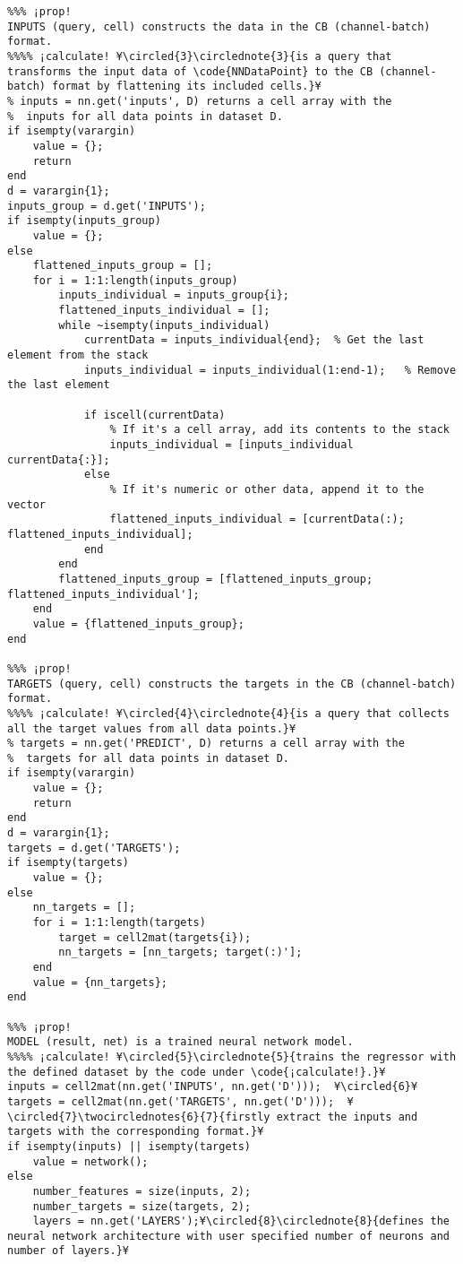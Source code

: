 \documentclass{tufte-handout}
\begin{document}
\begin{lstlisting}
%%% ¡prop!
INPUTS (query, cell) constructs the data in the CB (channel-batch) format.
%%%% ¡calculate! ¥\circled{3}\circlednote{3}{is a query that transforms the input data of \code{NNDataPoint} to the CB (channel-batch) format by flattening its included cells.}¥
% inputs = nn.get('inputs', D) returns a cell array with the
%  inputs for all data points in dataset D.
if isempty(varargin)
    value = {};
    return
end
d = varargin{1};
inputs_group = d.get('INPUTS');
if isempty(inputs_group)
    value = {};
else
    flattened_inputs_group = [];
    for i = 1:1:length(inputs_group)
        inputs_individual = inputs_group{i};
        flattened_inputs_individual = [];
        while ~isempty(inputs_individual)
            currentData = inputs_individual{end};  % Get the last element from the stack
            inputs_individual = inputs_individual(1:end-1);   % Remove the last element

            if iscell(currentData)
                % If it's a cell array, add its contents to the stack
                inputs_individual = [inputs_individual currentData{:}];
            else
                % If it's numeric or other data, append it to the vector
                flattened_inputs_individual = [currentData(:); flattened_inputs_individual];
            end
        end
        flattened_inputs_group = [flattened_inputs_group; flattened_inputs_individual'];
    end
    value = {flattened_inputs_group};
end

%%% ¡prop!
TARGETS (query, cell) constructs the targets in the CB (channel-batch) format.
%%%% ¡calculate! ¥\circled{4}\circlednote{4}{is a query that collects all the target values from all data points.}¥
% targets = nn.get('PREDICT', D) returns a cell array with the
%  targets for all data points in dataset D.
if isempty(varargin)
    value = {};
    return
end
d = varargin{1};
targets = d.get('TARGETS');
if isempty(targets)
    value = {};
else
    nn_targets = [];
    for i = 1:1:length(targets)
        target = cell2mat(targets{i});
        nn_targets = [nn_targets; target(:)'];
    end
    value = {nn_targets};
end

%%% ¡prop!
MODEL (result, net) is a trained neural network model.
%%%% ¡calculate! ¥\circled{5}\circlednote{5}{trains the regressor with the defined dataset by the code under \code{¡calculate!}.}¥
inputs = cell2mat(nn.get('INPUTS', nn.get('D')));  ¥\circled{6}¥
targets = cell2mat(nn.get('TARGETS', nn.get('D')));  ¥\circled{7}\twocirclednotes{6}{7}{firstly extract the inputs and targets with the corresponding format.}¥
if isempty(inputs) || isempty(targets)
    value = network();
else
    number_features = size(inputs, 2);
    number_targets = size(targets, 2);
    layers = nn.get('LAYERS');¥\circled{8}\circlednote{8}{defines the neural network architecture with user specified number of neurons and number of layers.}¥
    

\end{lstlisting}
\end{document}

